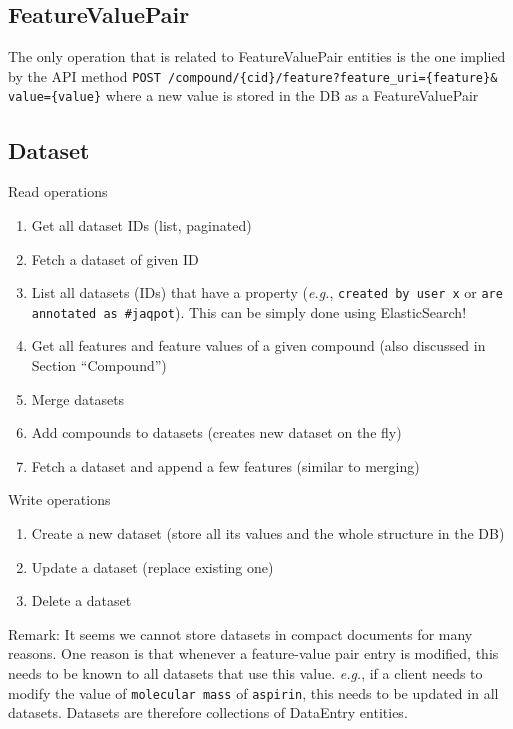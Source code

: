 \subsection{FeatureValuePair}

The only operation that is related to FeatureValuePair entities is the one implied by the API method 
\texttt{POST /compound/\{cid\}/feature?feature\_uri=\{feature\}\& value=\{value\}} 
where a new value is stored in the DB as a FeatureValuePair

\subsection{Dataset}

\noindent Read operations
\begin{enumerate}
 \item Get all dataset IDs (list, paginated)
\item  Fetch a dataset of given ID
\item  List all datasets (IDs) that have a property (\textit{e.g.}, 
   \texttt{created by user x} or \texttt{are annotated as \#jaqpot}). This can be simply done using ElasticSearch!
\item  Get all features and feature values of a given compound (also discussed in Section “Compound”)
\item  Merge datasets
\item  Add compounds to datasets (creates new dataset on the fly)
\item  Fetch a dataset and append a few features (similar to merging)
\end{enumerate}


\noindent Write operations
\begin{enumerate}
\item  Create a new dataset (store all its values and the whole structure in the DB)
\item  Update a dataset (replace existing one)
\item Delete a dataset
\end{enumerate}

\noindent Remark: It seems we cannot store datasets in compact documents for many reasons. 
One reason is that whenever a feature-value pair entry is modified, this needs to be known to 
all datasets that use this value. \textit{e.g.}, if a client needs to modify the value of \texttt{molecular mass}
of \texttt{aspirin}, this needs to be updated in all datasets. 
Datasets are therefore collections of DataEntry entities.




